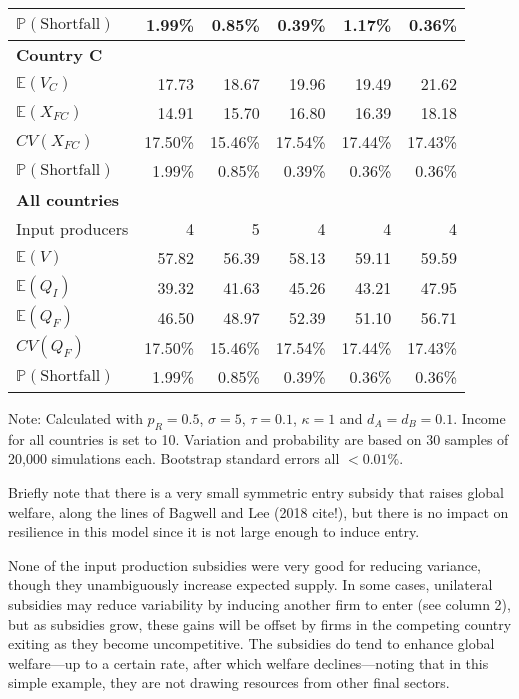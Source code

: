\documentclass{article}
\begin{document}
\begin{table}
\begin{threeparttable}
\begin{tabular}{lrrrrr}
            $\mathbb{P}(\text{Shortfall})$ & 1.99\% & 0.85\% & 0.39\% & 1.17\% & 0.36\% \\ 
            \midrule
            \textbf{Country C} \\
            $\mathbb{E}(V_C)$ & 17.73 & 18.67 & 19.96 & 19.49 & 21.62 \\
            $\mathbb{E}(X_{FC})$ & 14.91 & 15.70 & 16.80 & 16.39 & 18.18 \\
            $CV(X_{FC})$ & 17.50\% & 15.46\% & 17.54\% & 17.44\% & 17.43\% \\
            $\mathbb{P}(\text{Shortfall})$ & 1.99\% & 0.85\% & 0.39\% & 0.36\% & 0.36\% \\ 
            \midrule
            \textbf{All countries} \\
            Input producers & 4 & 5 & 4 & 4 & 4 \\
            $\mathbb{E}(V)$ & 57.82 & 56.39 & 58.13 & 59.11 & 59.59 \\
            $\mathbb{E}(Q_{I})$ & 39.32 & 41.63 & 45.26 & 43.21 & 47.95 \\
            $\mathbb{E}(Q_{F})$ & 46.50 & 48.97 & 52.39 & 51.10 & 56.71 \\
            $CV(Q_{F})$ & 17.50\% & 15.46\% & 17.54\% & 17.44\% & 17.43\% \\
            $\mathbb{P}(\text{Shortfall})$ & 1.99\% & 0.85\% & 0.39\% & 0.36\% & 0.36\% \\ 
            \bottomrule
        \end{tabular}
        \begin{tablenotes}
            \small \item Note: Calculated with $p_R = 0.5$, $\sigma = 5$, $\tau = 0.1$, $\kappa = 1$ and $d_A = d_B = 0.1$. Income for all countries is set to 10. Variation and probability are based on 30 samples of 20,000 simulations each. Bootstrap standard errors all $<0.01\%$.
        \end{tablenotes}
    \end{threeparttable}
\end{table}

Briefly note that there is a very small symmetric entry subsidy that raises global welfare, along the lines of Bagwell and Lee (2018 cite!), but there is no impact on resilience in this model since it is not large enough to induce entry.

None of the input production subsidies were very good for reducing variance, though they unambiguously increase expected supply. In some cases, unilateral subsidies may reduce variability by inducing another firm to enter (see column 2), but as subsidies grow, these gains will be offset by firms in the competing country exiting as they become uncompetitive. The subsidies do tend to enhance global welfare---up to a certain rate, after which welfare declines---noting that in this simple example, they are not drawing resources from other final sectors.
\end{document}
